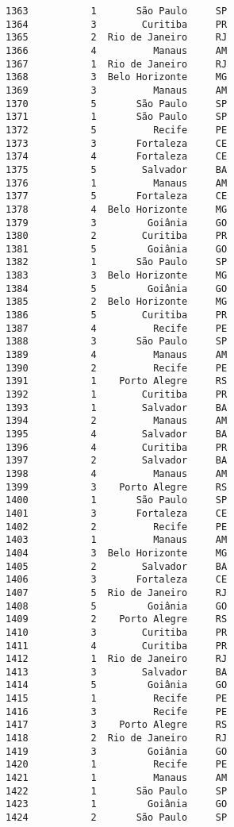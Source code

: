 \documentclass[11pt]{article}
\begin{document}
\begin{Verbatim}[commandchars=\\\{\}]
1363           1       São Paulo     SP  
1364           3        Curitiba     PR  
1365           2  Rio de Janeiro     RJ  
1366           4          Manaus     AM  
1367           1  Rio de Janeiro     RJ  
1368           3  Belo Horizonte     MG  
1369           3          Manaus     AM  
1370           5       São Paulo     SP  
1371           1       São Paulo     SP  
1372           5          Recife     PE  
1373           3       Fortaleza     CE  
1374           4       Fortaleza     CE  
1375           5        Salvador     BA  
1376           1          Manaus     AM  
1377           5       Fortaleza     CE  
1378           4  Belo Horizonte     MG  
1379           3         Goiânia     GO  
1380           2        Curitiba     PR  
1381           5         Goiânia     GO  
1382           1       São Paulo     SP  
1383           3  Belo Horizonte     MG  
1384           5         Goiânia     GO  
1385           2  Belo Horizonte     MG  
1386           5        Curitiba     PR  
1387           4          Recife     PE  
1388           3       São Paulo     SP  
1389           4          Manaus     AM  
1390           2          Recife     PE  
1391           1    Porto Alegre     RS  
1392           1        Curitiba     PR  
1393           1        Salvador     BA  
1394           2          Manaus     AM  
1395           4        Salvador     BA  
1396           4        Curitiba     PR  
1397           2        Salvador     BA  
1398           4          Manaus     AM  
1399           3    Porto Alegre     RS  
1400           1       São Paulo     SP  
1401           3       Fortaleza     CE  
1402           2          Recife     PE  
1403           1          Manaus     AM  
1404           3  Belo Horizonte     MG  
1405           2        Salvador     BA  
1406           3       Fortaleza     CE  
1407           5  Rio de Janeiro     RJ  
1408           5         Goiânia     GO  
1409           2    Porto Alegre     RS  
1410           3        Curitiba     PR  
1411           4        Curitiba     PR  
1412           1  Rio de Janeiro     RJ  
1413           3        Salvador     BA  
1414           5         Goiânia     GO  
1415           1          Recife     PE  
1416           3          Recife     PE  
1417           3    Porto Alegre     RS  
1418           2  Rio de Janeiro     RJ  
1419           3         Goiânia     GO  
1420           1          Recife     PE  
1421           1          Manaus     AM  
1422           1       São Paulo     SP  
1423           1         Goiânia     GO  
1424           2       São Paulo     SP  

\end{Verbatim}
\end{document}
